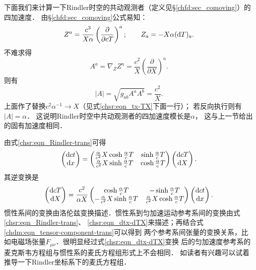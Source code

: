 下面我们来计算一下Rindler时空的共动观测者（定义见\S\ref{chfd:sec_comoving}）的四加速度．
由\S\ref{chfd:sec_comoving}公式易知：
\begin{equation}
    Z^a =\frac{c^3}{X\alpha} \left(\frac{\partial}{\partial cT}\right)^a ;\qquad
    Z_a= -X\alpha  ({\rm d}T)_a .
\end{equation}
不难求得
\begin{equation}
    A^a = \nabla_Z Z^a = \frac{c^2}{X} \left(\frac{\partial}{\partial X}\right)^a .
\end{equation}
则有
\begin{equation}
    |A| = \sqrt{g_{ab} A^a A^b} = \frac{c^2}{X} .
\end{equation}
上面作了替换$c^2 \alpha^{-1} \to X$（见式\eqref{chsr:eqn_tx-TX}下面一行）；
若反向执行则有$|A|=\alpha$．
这说明Rindler时空中共动观测者的四加速度模长是$\alpha$，
这与上一节给出的固有加速度相同．


由式\eqref{chsr:eqn_Rindler-trans}可得
\begin{equation}\label{chsr:eqn_dtx-dTX}
        \begin{pmatrix}
            {\rm d}ct \\ {\rm d}x
        \end{pmatrix}= 
        \begin{pmatrix}
          \frac{\alpha}{c^2} X\cosh \frac{\alpha}{c}T & \sinh\frac{\alpha}{c} T \\ 
          \frac{\alpha}{c^2} X\sinh \frac{\alpha}{c}T & \cosh\frac{\alpha}{c} T
        \end{pmatrix}
        \begin{pmatrix}
            {\rm d}cT \\ {\rm d}X
        \end{pmatrix}. 
\end{equation}
其逆变换是
\begin{equation}\label{chsr:eqn_dtx-dTX-inv}
\begin{pmatrix}
    {\rm d}cT \\ {\rm d}X
\end{pmatrix}= \frac{c^2}{\alpha X}
\begin{pmatrix}
    \cosh \frac{\alpha}{c}T & -\sinh \frac{\alpha}{c}T \\ 
 -\frac{\alpha}{c^2}X \sinh \frac{\alpha}{c}T & \frac{\alpha}{c^2}X \cosh \frac{\alpha}{c}T
\end{pmatrix}
\begin{pmatrix}
    {\rm d}ct \\ {\rm d}x
\end{pmatrix} .
\end{equation}
惯性系间的变换由洛伦兹变换描述．惯性系到匀加速运动参考系间的变换由式\eqref{chsr:eqn_Rindler-trans}、
\eqref{chsr:eqn_dtx-dTX}来描述；再结合式\eqref{chdm:eqn_tensor-component-trans}可以得到
两个参考系间张量的变换关系，比如电磁场张量$F_{\mu\nu}$．很明显经过式\eqref{chsr:eqn_dtx-dTX}变换
后的匀加速度参考系的麦克斯韦方程组与惯性系的麦氏方程组形式上不会相同．
如读者有兴趣可以试着推导一下Rindler坐标系下的麦氏方程组．




